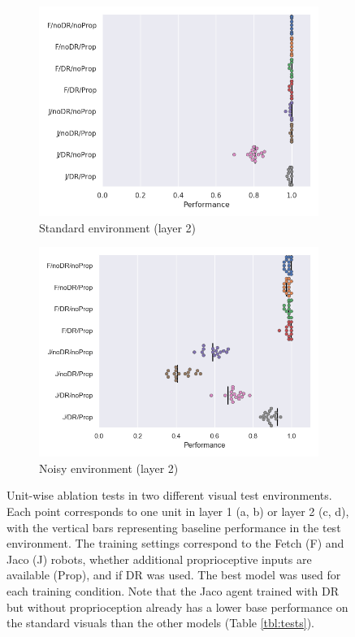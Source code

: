 \begin{figure}
  \begin{subfigure}{0.49\linewidth}
    \includegraphics[width=\textwidth]{figures/chapter6/unitablation/conv2_ablations}
    \caption{Standard environment (layer 2)}
  \end{subfigure}
  \begin{subfigure}{0.49\linewidth}
    \includegraphics[width=\textwidth]{figures/chapter6/unitablation/conv2_ablations_noisy}
    \caption{Noisy environment (layer 2)}
  \end{subfigure}
  \caption{Unit-wise ablation tests in two different visual test environments. Each point corresponds to one unit in layer 1 (a, b) or layer 2 (c, d), with the vertical bars representing baseline performance in the test environment. The training settings correspond to the Fetch (F) and Jaco (J) robots, whether additional proprioceptive inputs are available (Prop), and if DR was used. The best model was used for each training condition. Note that the Jaco agent trained with DR but without proprioception already has a lower base performance on the standard visuals than the other models (Table \ref{tbl:tests}).}
  \label{fig:ablations}
\end{figure}

